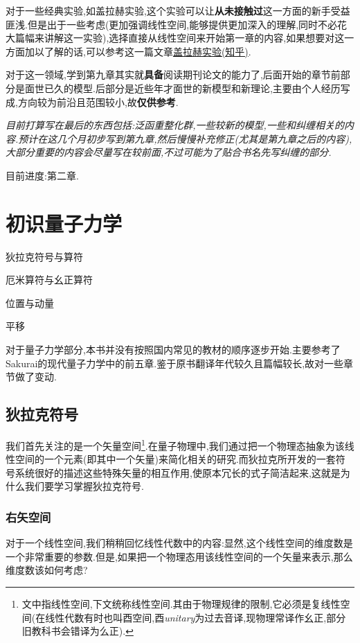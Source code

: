 \documentclass[lang=cn,newtx,10pt,scheme=chinese,thmcnt=section]{elegantbook}
\begin{document}
对于一些经典实验,如盖拉赫实验,这个实验可以让\textbf{从未接触过}这一方面的新手受益匪浅.但是出于一些考虑(更加强调线性空间,能够提供更加深入的理解,同时不必花大篇幅来讲解这一实验),选择直接从线性空间来开始第一章的内容,如果想要对这一方面加以了解的话,可以参考这一篇文章\href{https://zhuanlan.zhihu.com/p/596869364}{盖拉赫实验(知乎)}.

对于这一领域,学到第九章其实就\textbf{具备}阅读期刊论文的能力了,后面开始的章节前部分是面世已久的模型.后部分是近些年才面世的新模型和新理论,主要由个人经历写成,方向较为前沿且范围较小,故\textbf{仅供参考}.

\textit{目前打算写在最后的东西包括:泛函重整化群,一些较新的模型,一些和纠缠相关的内容.预计在这几个月初步写到第九章,然后慢慢补充修正(尤其是第九章之后的内容),大部分重要的内容会尽量写在较前面,不过可能为了贴合书名先写纠缠的部分.}

目前进度:第二章.


\chapter{初识量子力学}
\begin{introduction}
	\item 狄拉克符号与算符
	\item 厄米算符与幺正算符
	\item 位置与动量
	\item 平移
\end{introduction}
对于量子力学部分,本书并没有按照国内常见的教材的顺序逐步开始.主要参考了Sakurai的现代量子力学中的前五章.鉴于原书翻译年代较久且篇幅较长,故对一些章节做了变动.
\section{狄拉克符号}
我们首先关注的是一个矢量空间\footnote{文中指线性空间,下文统称线性空间.其由于物理规律的限制,它必须是复线性空间(在线性代数有时也叫酉空间,酉\textit{unitary}为过去音译,现物理常译作幺正,部分旧教科书会错译为么正).}.在量子物理中,我们通过把一个物理态抽象为该线性空间的一个元素(即其中一个矢量)来简化相关的研究.而狄拉克所开发的一套符号系统很好的描述这些特殊矢量的相互作用,使原本冗长的式子简洁起来,这就是为什么我们要学习掌握狄拉克符号.
\subsection*{右矢空间}
对于一个线性空间,我们稍稍回忆线性代数中的内容:显然,这个线性空间的维度数是一个非常重要的参数.但是,如果把一个物理态用该线性空间的一个矢量来表示,那么维度数该如何考虑?
\end{document}
